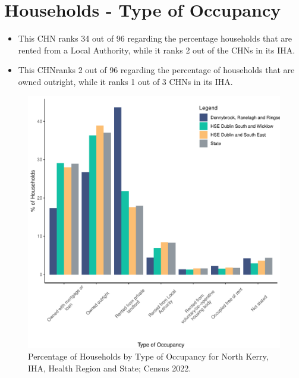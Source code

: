 \documentclass{article}
\begin{document}
\section{Households - Type of Occupancy}\label{sect:Households}
\begin{itemize}
\item This CHN ranks  34 out of 96 regarding the percentage households that are rented from a Local Authority, while it ranks  2 out of the CHNs in its IHA. 
\item This CHNranks  2 out of 96 regarding the percentage of households that are owned outright, while it ranks   1 out of 3 CHNs in its IHA.
\end{itemize}
\begin{figure}[H]
	\centering
	\includegraphics[width = 140mm]{../figures/HouseholdsED.pdf}
	\caption{Percentage of Households by Type of Occupancy for North Kerry, IHA, Health Region and State; Census 2022.}
	\label{fig:vbnv}
	\end{figure}
\end{document}
